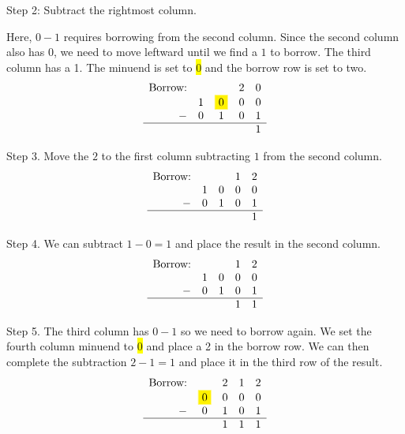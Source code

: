 Step 2: Subtract the rightmost column.

Here, \(0 - 1\) requires borrowing from the second column. Since the second column also has \(0\), we need to move leftward until we find a \(1\) to borrow. The third column has a 1. The minuend is set to \colorbox{yellow}{0} and the borrow row is set to two.
\[
\begin{array}{rcccc}
    \text{Borrow:} &   &   & 2 & 0 \\ %
                   & 1 & \fcolorbox{yellow}{yellow}{0} & 0 & 0 \\ %
                 - & 0 & 1 & 0 & 1 \\ %
  \hline
                   &   &   &   & 1 \\ %
\end{array}
\]

Step 3. Move the \(2\) to the first column subtracting \(1\) from the second column. 
\[
\begin{array}{rcccc}
    \text{Borrow:} &   &   & 1 & 2 \\ %
                   & 1 & 0 & 0 & 0 \\ %
                 - & 0 & 1 & 0 & 1 \\ %
  \hline
                   &   &   &   & 1 \\ %
\end{array}
\]



Step 4. We can subtract \(1-0=1\) and place the result in the second column.
\[
\begin{array}{rcccc}
    \text{Borrow:} &   &   & 1 & 2 \\ %
                   & 1 & 0 & 0 & 0 \\ %
                 - & 0 & 1 & 0 & 1 \\ %
  \hline
                   &   &   & 1 & 1 \\ %
\end{array}
\]

Step 5. The third column has \(0-1\) so we need to borrow again. We set the fourth column minuend to \colorbox{yellow}{0} and place a 2 in the borrow row. We can then complete the subtraction \(2-1=1\) and place it in the third row of the result.
\[
\begin{array}{rcccc}
    \text{Borrow:} &   & 2 & 1 & 2 \\ %
                   & \fcolorbox{yellow}{yellow}{0} & 0 & 0 & 0 \\ %
                 - & 0 & 1 & 0 & 1 \\ %
  \hline
                   &   & 1 & 1 & 1 \\ %
\end{array}
\]

